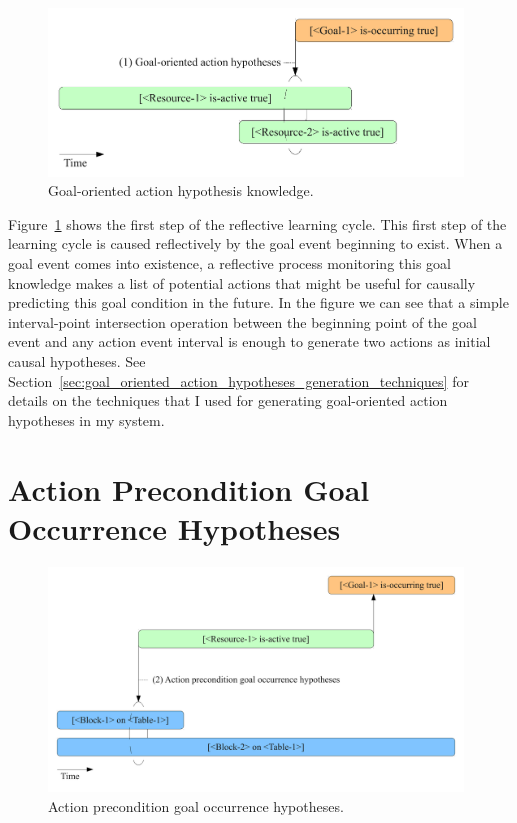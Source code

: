 \begin{figure}[bth]
  \center
  \includegraphics[width=11cm]{gfx/learning_to_plan-1-goal_oriented_action_hypotheses}
  \caption[Goal-oriented action hypothesis knowledge]{Goal-oriented action hypothesis knowledge.}
  \label{fig:goal_oriented_action_hypotheses}
\end{figure}


Figure~\ref{fig:goal_oriented_action_hypotheses} shows the first step
of the reflective learning cycle.  This first step of the learning
cycle is caused reflectively by the goal event beginning to exist.
When a goal event comes into existence, a reflective process
monitoring this goal knowledge makes a list of potential actions that
might be useful for causally predicting this goal condition in the
future.  In the figure we can see that a simple interval-point
intersection operation between the beginning point of the goal event
and any action event interval is enough to generate two actions as
initial causal hypotheses.  See
Section~\ref{sec:goal_oriented_action_hypotheses_generation_techniques}
for details on the techniques that I used for generating goal-oriented
action hypotheses in my system.


\section{Action Precondition Goal Occurrence Hypotheses}

\begin{figure}[bth]
  \center
  \includegraphics[width=11cm]{gfx/learning_to_plan-2-action_precondition_goal_occurrence_hypotheses}
  \caption[Action precondition goal occurrence hypotheses]{Action precondition goal occurrence hypotheses.}
  \label{fig:action_precondition_goal_occurrence_hypotheses}
\end{figure}


